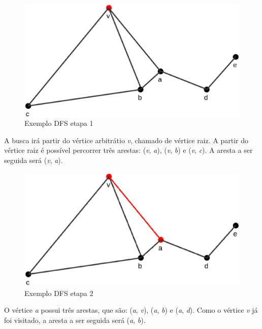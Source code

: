 \begin{figure}[!h]
	\centering
	\includegraphics[scale=0.25]{figuras/capitulo2/dfs/dfs1.eps}
	\caption{Exemplo DFS etapa 1}
	\label{dfs1}
\end{figure}

A busca irá partir do vértice arbitrátio \textit{v}, chamado de vértice raiz. A partir do vértice raiz é possível percorrer três arestas: (\textit{v}, \textit{a}), (\textit{v}, \textit{b}) e (\textit{v}, \textit{c}). A aresta a ser seguida será (\textit{v}, \textit{a}).

\begin{figure}[!h]
	\centering
	\includegraphics[scale=0.25]{figuras/capitulo2/dfs/dfs2.eps}
	\caption{Exemplo DFS etapa 2}
	\label{dfs2}
\end{figure}

O vértice \textit{a} possui três arestas, que são: (\textit{a}, \textit{v}), (\textit{a}, \textit{b}) e (\textit{a}, \textit{d}). Como o vértice \textit{v} já foi visitado, a aresta a ser seguida será (\textit{a}, \textit{b}).

